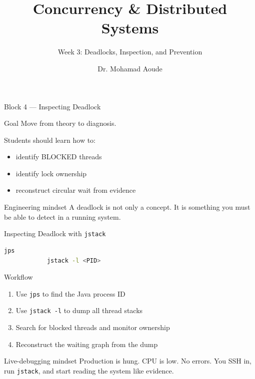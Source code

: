 \documentclass[aspectratio=169,11pt]{beamer}
\title{Concurrency \& Distributed Systems}
\subtitle{Week 3: Deadlocks, Inspection, and Prevention}
\author{Dr. Mohamad Aoude}
\institute{Lebanese University \\ Faculty of Engineering}
\date{}
\begin{document}
	\begin{frame}
		\titlepage
	\end{frame}
	
	\begin{frame}{Block 4 --- Inspecting Deadlock}
		\begin{block}{Goal}
			Move from theory to diagnosis.
		\end{block}
		
		\bigskip
		
		Students should learn how to:
		\begin{itemize}
			\item identify BLOCKED threads
			\item identify lock ownership
			\item reconstruct circular wait from evidence
		\end{itemize}
		
		\bigskip
		
		\begin{alertblock}{Engineering mindset}
			A deadlock is not only a concept.  
			It is something you must be able to detect in a running system.
		\end{alertblock}
	\end{frame}
	
	\begin{frame}[fragile]{Inspecting Deadlock with \texttt{jstack}}
		\begin{lstlisting}[language=bash]
			jps
			jstack -l <PID>
		\end{lstlisting}
		
		\vspace{0.3cm}
		
		\begin{block}{Workflow}
			\begin{enumerate}
				\item Use \texttt{jps} to find the Java process ID
				\item Use \texttt{jstack -l} to dump all thread stacks
				\item Search for blocked threads and monitor ownership
				\item Reconstruct the waiting graph from the dump
			\end{enumerate}
		\end{block}
		
		\begin{alertblock}{Live-debugging mindset}
			Production is hung. CPU is low. No errors.  
			You SSH in, run \texttt{jstack}, and start reading the system like evidence.
		\end{alertblock}
	\end{frame}
	
\end{document}
